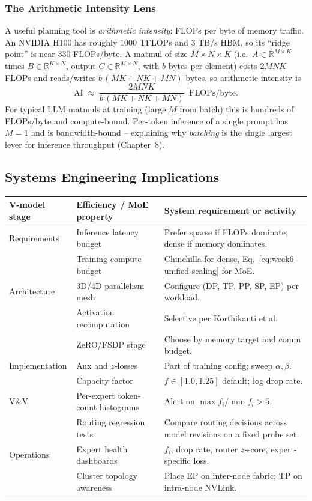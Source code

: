 \subsubsection{The Arithmetic Intensity Lens}

A useful planning tool is \emph{arithmetic intensity}: FLOPs per byte
of memory traffic. An NVIDIA H100 has roughly $1000$ TFLOPs and
$3$ TB/s HBM, so its ``ridge point'' is near $330$ FLOPs/byte. A
matmul of size $M \times N \times K$ (i.e.\ $A \in \mathbb{R}^{M\times K}$
times $B \in \mathbb{R}^{K\times N}$, output $C \in \mathbb{R}^{M\times N}$,
with $b$ bytes per element) costs $2MNK$ FLOPs and reads/writes
$b\,(MK + NK + MN)$ bytes, so arithmetic intensity is
\begin{equation*}
\mathrm{AI} \;\approx\; \frac{2MNK}{b\,(MK + NK + MN)}\;\;\mathrm{FLOPs/byte}.
\end{equation*}
For typical LLM matmuls at training (large $M$ from batch) this
is hundreds of FLOPs/byte and compute-bound. Per-token inference of a
single prompt has $M = 1$ and is bandwidth-bound -- explaining why
\emph{batching} is the single largest lever for inference throughput
(Chapter~8).

\subsection{Systems Engineering Implications}

\begin{center}
\begin{tabular}{|p{3.4cm}|p{3.4cm}|p{6.8cm}|}
\hline
V-model stage & Efficiency / MoE property & System requirement or activity \\
\hline
Requirements & Inference latency budget & Prefer sparse if FLOPs
   dominate; dense if memory dominates. \\
 & Training compute budget & Chinchilla for dense, Eq.\,
   \eqref{eq:week6-unified-scaling} for MoE. \\
\hline
Architecture & 3D/4D parallelism mesh & Configure
   (DP, TP, PP, SP, EP) per workload. \\
 & Activation recomputation & Selective per Korthikanti et al. \\
 & ZeRO/FSDP stage & Choose by memory target and
   comm budget. \\
\hline
Implementation & Aux and $z$-losses & Part of training config;
   sweep $\alpha, \beta$. \\
 & Capacity factor & $f \in [1.0, 1.25]$ default;
   log drop rate. \\
\hline
V\&V & Per-expert token-count histograms
     & Alert on $\max f_i / \min f_i > 5$. \\
 & Routing regression tests & Compare routing decisions across
   model revisions on a fixed probe set. \\
\hline
Operations & Expert health dashboards & $f_i$, drop rate, router
   $z$-score, expert-specific loss. \\
 & Cluster topology awareness & Place EP on inter-node fabric; TP
   on intra-node NVLink. \\
\hline
\end{tabular}
\end{center}

